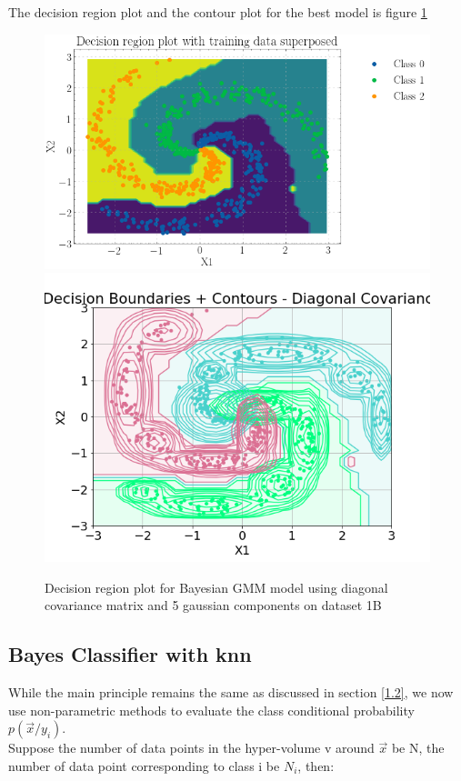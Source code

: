 \documentclass[11pt,a4paper]{article}
\begin{document}
The decision region plot and the contour plot for the best model is figure \ref{fig:dec1bGMMdiag}
\begin{figure}[H]
    \centering
    \includegraphics[scale = 0.5]{images/decisionReg_ds2.png}
    \includegraphics[scale = 0.5]{images/contour1b.png}

    \caption{Decision region plot for Bayesian GMM model using diagonal covariance matrix and 5 gaussian components on dataset 1B}
    \label{fig:dec1bGMMdiag}
\end{figure}

\subsection{Bayes Classifier with knn}

While the main principle remains the same as discussed in section \ref{1.2}, we now use non-parametric methods to evaluate the class conditional probability $p(\vec{x}/y_{i})$.
\\Suppose the number of data points in the hyper-volume v around $\vec{x}$ be N, the number of data point corresponding to class i be $N_i$, then:
\end{document}
